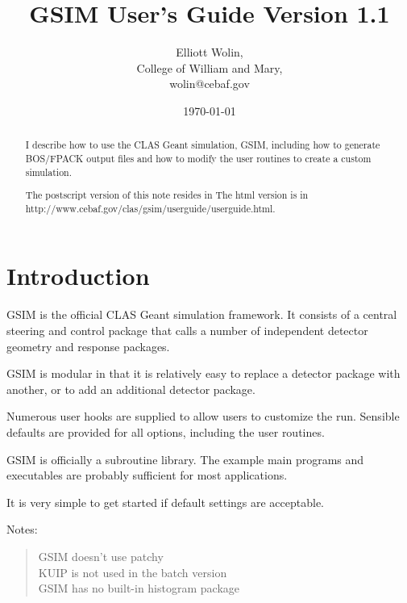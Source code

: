 \documentclass{article}
\begin{document}
\sloppy
\title{GSIM User's Guide Version 1.1}
\author{Elliott Wolin,\\ College of William and Mary,\\ wolin@cebaf.gov}
\date{\today}
\maketitle

\begin{abstract}
I describe how to use the CLAS Geant simulation, GSIM, including how
to generate BOS/FPACK output files and how to modify the user routines
to create a custom simulation. \\
\par
The postscript version of this note resides in
The html version is in http://www.cebaf.gov/clas/gsim/userguide/userguide.html.
\end{abstract}

\section{Introduction}
\label{introduction}

GSIM is the official CLAS Geant simulation framework.  It consists of
a central steering and control package that calls a number of
independent detector geometry and response packages.

GSIM is modular in that it is relatively easy to replace a detector
package with another, or to add an additional detector package.

Numerous user hooks are supplied to allow users to customize the run.
Sensible defaults are provided for all options, including the user
routines.

GSIM is officially a subroutine library.  The example main programs
and executables are probably sufficient for most applications.

It is very simple to get started if default settings are acceptable.

Notes:
\begin{quote}
GSIM doesn't use patchy \\
KUIP is not used in the batch version \\
GSIM has no built-in histogram package
\end{quote}

\end{document}
